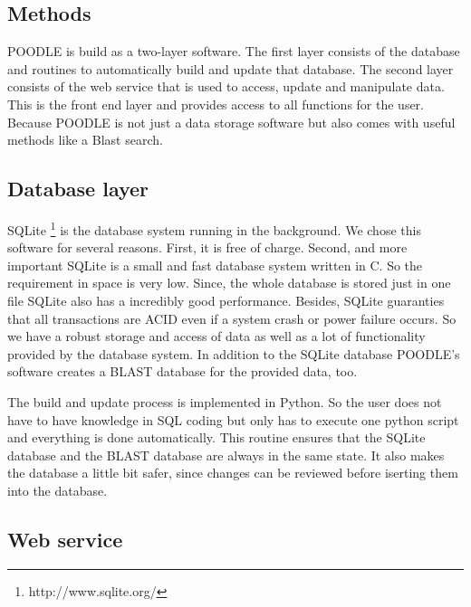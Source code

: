 \documentclass{bioinfo}
\begin{document}
\begin{methods}
\section{Methods}

POODLE is build as a two-layer software. The first layer consists of the database and routines to 
automatically build and update that database. The second layer consists of the web service that is 
used to access, update and manipulate data. This is the front end layer and provides access to all 
functions for the user. Because POODLE is not just a data storage software but also comes with useful 
methods like a Blast search.

\subsection{Database layer}

SQLite \footnote{http://www.sqlite.org/} is the database system running in the background. We chose 
this software for several reasons. First, it is free of charge. Second, and more important SQLite is 
a small and fast database system written in C. So the requirement in space is very low. Since, the 
whole database is stored just in one file SQLite also has a incredibly good performance. Besides, 
SQLite guaranties that all transactions are ACID even if a system crash or power failure occurs. So 
we have a robust storage and access of data as well as a lot of functionality provided by the database 
system. In addition to the SQLite database POODLE's software creates a BLAST database for the provided 
data, too. 

The build and update process is implemented in Python. So the user does not have to have knowledge in 
SQL coding but only has to execute one python script and everything is done automatically. This routine 
ensures that the SQLite database and the BLAST database are always in the same state. It also makes 
the database a little bit safer, since changes can be reviewed before iserting them into the database.

\subsection{Web service}


\end{methods}
\end{document}
